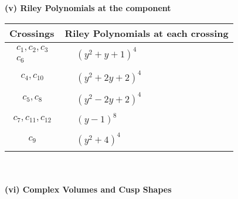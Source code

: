 \documentclass[1p]{elsarticle_modified}
\theoremstyle{definition}
\begin{document}
\newpage\renewcommand{\arraystretch}{1}
\flushleft \textbf{(v) Riley Polynomials at the component}\newline \\
\begin{tabular}{m{50pt}|m{274pt}}
Crossings & \hspace{64pt}Riley Polynomials at each crossing \\
\hline $$\begin{aligned}c_{1},c_{2},c_{3}\\c_{6}\end{aligned}$$&$\begin{aligned}
&(y^2+y+1)^4
\end{aligned}$\\
\hline $$\begin{aligned}c_{4},c_{10}\end{aligned}$$&$\begin{aligned}
&(y^2+2 y+2)^4
\end{aligned}$\\
\hline $$\begin{aligned}c_{5},c_{8}\end{aligned}$$&$\begin{aligned}
&(y^2-2 y+2)^4
\end{aligned}$\\
\hline $$\begin{aligned}c_{7},c_{11},c_{12}\end{aligned}$$&$\begin{aligned}
&(y-1)^8
\end{aligned}$\\
\hline $$\begin{aligned}c_{9}\end{aligned}$$&$\begin{aligned}
&(y^2+4)^4
\end{aligned}$\\
\hline
\end{tabular}\\~\\
\newpage\flushleft \textbf{(vi) Complex Volumes and Cusp Shapes}
\end{document}
